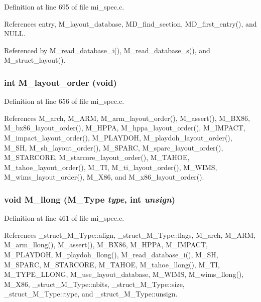 Definition at line 695 of file mi\_\-spec.c.

References entry, M\_\-layout\_\-database, MD\_\-find\_\-section, MD\_\-first\_\-entry(), and NULL.

Referenced by M\_\-read\_\-database\_\-i(), M\_\-read\_\-database\_\-s(), and M\_\-struct\_\-layout().
\subsubsection{\setlength{\rightskip}{0pt plus 5cm}int M\_\-layout\_\-order (void)}\label{mi__spec_8c_99d98f0711d522e17f0f04ab2eafb5be}




Definition at line 656 of file mi\_\-spec.c.

References M\_\-arch, M\_\-ARM, M\_\-arm\_\-layout\_\-order(), M\_\-assert(), M\_\-BX86, M\_\-bx86\_\-layout\_\-order(), M\_\-HPPA, M\_\-hppa\_\-layout\_\-order(), M\_\-IMPACT, M\_\-impact\_\-layout\_\-order(), M\_\-PLAYDOH, M\_\-playdoh\_\-layout\_\-order(), M\_\-SH, M\_\-sh\_\-layout\_\-order(), M\_\-SPARC, M\_\-sparc\_\-layout\_\-order(), M\_\-STARCORE, M\_\-starcore\_\-layout\_\-order(), M\_\-TAHOE, M\_\-tahoe\_\-layout\_\-order(), M\_\-TI, M\_\-ti\_\-layout\_\-order(), M\_\-WIMS, M\_\-wims\_\-layout\_\-order(), M\_\-X86, and M\_\-x86\_\-layout\_\-order().
\subsubsection{\setlength{\rightskip}{0pt plus 5cm}void M\_\-llong (\bf{M\_\-Type} {\em type}, int {\em unsign})}\label{mi__spec_8c_ac06107e205e4d2d7c1a1f126e72199f}




Definition at line 461 of file mi\_\-spec.c.

References \_\-struct\_\-M\_\-Type::align, \_\-struct\_\-M\_\-Type::flags, M\_\-arch, M\_\-ARM, M\_\-arm\_\-llong(), M\_\-assert(), M\_\-BX86, M\_\-HPPA, M\_\-IMPACT, M\_\-PLAYDOH, M\_\-playdoh\_\-llong(), M\_\-read\_\-database\_\-i(), M\_\-SH, M\_\-SPARC, M\_\-STARCORE, M\_\-TAHOE, M\_\-tahoe\_\-llong(), M\_\-TI, M\_\-TYPE\_\-LLONG, M\_\-use\_\-layout\_\-database, M\_\-WIMS, M\_\-wims\_\-llong(), M\_\-X86, \_\-struct\_\-M\_\-Type::nbits, \_\-struct\_\-M\_\-Type::size, \_\-struct\_\-M\_\-Type::type, and \_\-struct\_\-M\_\-Type::unsign.

